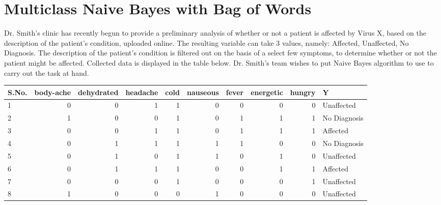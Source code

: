 \documentclass[11pt, letterpaper]{article}
\begin{document}
\newpage

\section{Multiclass Naive Bayes with Bag of Words}
    
    Dr. Smith's clinic has recently begun to provide a preliminary analysis of whether or not a patient is affected by Virus X, based on the description of the patient's condition, uploaded online. The resulting variable can take 3 values, namely: Affected, Unaffected, No Diagnosis. The description of the patient's condition is filtered out on the basis of a select few symptoms, to determine whether or not the patient might be affected. Collected data is displayed in the table below. Dr. Smith's team wishes to put Naive Bayes algorithm to use to carry out the task at hand.
    
    \begin{table}[H]
    \centering
    \small
    \begin{tabular}{|l | r | r | r | r | r | r | r | r | l|}
    \hline
    S.No. & body-ache & dehydrated & headache & cold & nauseous & fever & energetic & hungry & Y \\ \hline
    1           & 0           & 0         & 1    & 1     & 0       & 0       & 0            & 0      & Unaffected \\
    2           & 1           & 0         & 0    & 1     & 0       & 1       & 1            & 1      & No Diagnosis\\
    3           & 0           & 0         & 1    & 1     & 0       & 1       & 1            & 1      & Affected\\
    4           & 0           & 1         & 1    & 1     & 1       & 1       & 0            & 0      & No Diagnosis\\
    5           & 0           & 1         & 0    & 1     & 1       & 0       & 1            & 0      & Unaffected\\
    6           & 0           & 1         & 1    & 1     & 0       & 0       & 1            & 1      & Affected\\
    7           & 0           & 0         & 0    & 1     & 0       & 0       & 0            & 1      & Unaffected\\
    8           & 1           & 0         & 0    & 0     & 1       & 0       & 0            & 0      & Unaffected\\
    \hline
    \end{tabular}
    \end{table}
    
\end{document}
